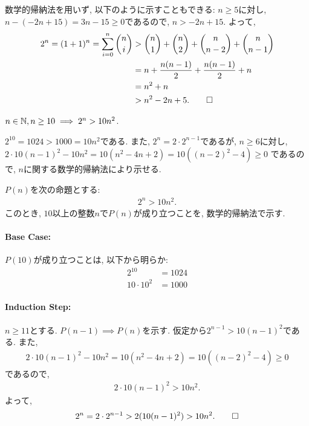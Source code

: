 \begin{rem}
  数学的帰納法を用いず, 以下のように示すこともできる:
  $n\geq 5$に対し, $n-(-2n+15)=3n-15\geq 0$であるので,
  $n>-2n+15$. よって,
  \begin{align*}
    2^n=(1+1)^n=\sum_{i=0}^n \binom{n}{i}
    &> \binom{n}{1}+\binom{n}{2}+\binom{n}{n-2}+\binom{n}{n-1}\\
    &=n+\frac{n(n-1)}{2}+\frac{n(n-1)}{2}+n\\
    &=n^2+n\\
    &>n^2-2n+5
    .\qedhere
  \end{align*}
\end{rem}

\begin{prop}
  \label{p:20230817}
  $n\in\mathbb{N}, n\geq 10\implies 2^n>10n^2$.
\end{prop}
\begin{proof**}
  $2^{10}=1024>1000=10n^2$である.
  また,
  $2^n=2\cdot 2^{n-1}$であるが,
  $n\geq 6$に対し,
  $2\cdot 10(n-1)^2-10n^2=10(n^2-4n+2)=10((n-2)^2-4)\geq 0$
  であるので,
  $n$に関する数学的帰納法により示せる.
\end{proof**}
\begin{proof*}
  $P(n)$を次の命題とする:
  \begin{align*}
    2^n > 10n^2
    .
  \end{align*}
  このとき,
  $10$以上の整数$n$で$P(n)$が成り立つことを,
  数学的帰納法で示す.

  \paragraph{Base Case:}
  $P(10)$が成り立つことは, 以下から明らか:
  \begin{align*}
    2^{10}&=1024\\
    10\cdot 10^2&=1000
  \end{align*}
  \paragraph{Induction Step:}
  $n\geq 11$とする.
  $P(n-1)\implies P(n)$を示す.
  仮定から$2^{n-1} > 10(n-1)^2$である.
  また,
  \begin{align*}
    2\cdot 10(n-1)^2-10n^2=10(n^2-4n+2)=10((n-2)^2-4)\geq 0
  \end{align*}
  であるので,
  \begin{align*}
    2\cdot 10(n-1)^2>10n^2.
  \end{align*}
  よって,
  \begin{align*}
    2^n=2\cdot 2^{n-1}>2(10(n-1)^2)>10n^2
    .\qedhere
  \end{align*}
\end{proof*}

